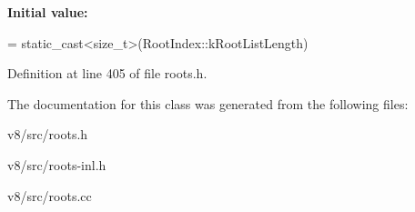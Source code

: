 {\bfseries Initial value\+:}
\begin{DoxyCode}
=
      \textcolor{keyword}{static\_cast<}\textcolor{keywordtype}{size\_t}\textcolor{keyword}{>}(RootIndex::kRootListLength)
\end{DoxyCode}


Definition at line 405 of file roots.\+h.



The documentation for this class was generated from the following files\+:\begin{DoxyCompactItemize}
\item 
v8/src/roots.\+h\item 
v8/src/roots-\/inl.\+h\item 
v8/src/roots.\+cc\end{DoxyCompactItemize}
